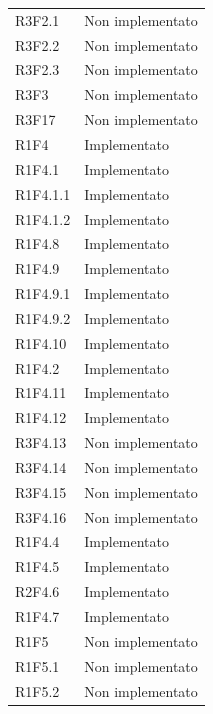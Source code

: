 \begin{longtable} {
            >{\centering}p{64.5mm} 
            >{}p{64.5mm}
            }
            R3F2.1 & Non implementato \TBstrut \\ [2mm]
            R3F2.2 & Non implementato \TBstrut \\ [2mm]
            R3F2.3 & Non implementato \TBstrut \\ [2mm]
            R3F3 & Non implementato \TBstrut \\ [2mm]
            R3F17 & Non implementato \TBstrut \\ [2mm]	
            R1F4 & Implementato \TBstrut \\ [2mm]		
            R1F4.1 & Implementato \TBstrut \\ [2mm]		
            R1F4.1.1 & Implementato \TBstrut \\ [2mm]
            R1F4.1.2 & Implementato \TBstrut \\ [2mm]
            R1F4.8 & Implementato \TBstrut \\ [2mm]
            R1F4.9 & Implementato \TBstrut \\ [2mm]
            R1F4.9.1 & Implementato \TBstrut \\ [2mm]
            R1F4.9.2 & Implementato \TBstrut \\ [2mm]
            R1F4.10 & Implementato \TBstrut \\ [2mm]	
            R1F4.2 & Implementato \TBstrut \\ [2mm]
            R1F4.11 & Implementato \TBstrut \\ [2mm]
            R1F4.12 & Implementato \TBstrut \\ [2mm]
            R3F4.13 & Non implementato \TBstrut \\ [2mm]
            R3F4.14 & Non implementato \TBstrut \\ [2mm]
            R3F4.15 & Non implementato \TBstrut \\ [2mm]
            R3F4.16 & Non implementato \TBstrut \\ [2mm]		
            R1F4.4 & Implementato \TBstrut \\ [2mm]
            R1F4.5 & Implementato \TBstrut \\ [2mm]		
            R2F4.6 & Implementato \TBstrut \\ [2mm]		
            R1F4.7 & Implementato \TBstrut \\ [2mm]
            R1F5 & Non implementato \TBstrut \\ [2mm]
            R1F5.1 & Non implementato \TBstrut \\ [2mm]
            R1F5.2 & Non implementato \TBstrut \\ [2mm]

\end{longtable}
